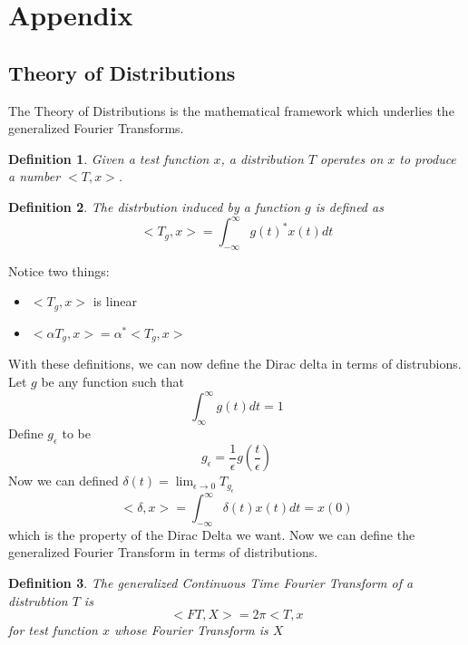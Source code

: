 \documentclass{article}
\newtheorem{definition}{Definition}
\begin{document}
\section{Appendix}
\subsection{Theory of Distributions}
The Theory of Distributions is the mathematical framework which underlies the generalized Fourier Transforms.
\begin{definition}
    Given a test function $x$, a distribution $T$ operates on $x$ to produce a number $<T,x>$.
\end{definition}
\begin{definition}
    The distrbution induced by a function $g$ is defined as
    $$<T_g, x> = \int_{-\infty}^{\infty}{g(t)^*x(t)dt}$$
\end{definition}
Notice two things:
\begin{itemize}
    \item $<T_g, x>$ is linear
    \item $<\alpha T_g, x> = \alpha^*<T_g, x>$
\end{itemize}
With these definitions, we can now define the Dirac delta in terms of distrubions.
Let $g$ be any function such that
$$\int_{\infty}^{\infty}{g(t)dt} = 1$$
Define $g_\epsilon$ to be
$$g_\epsilon = \frac{1}{\epsilon}g(\frac{t}{\epsilon})$$
Now we can defined $\delta(t) = \lim_{\epsilon \rightarrow 0}{T_{g_\epsilon}}$
$$<\delta, x> = \int_{-\infty}^{\infty}{\delta(t)x(t)dt} = x(0)$$ 
which is the property of the Dirac Delta we want. Now we can define the generalized Fourier Transform
in terms of distributions.
\begin{definition}
    The generalized Continuous Time Fourier Transform of a distrubtion $T$ is
    $$<FT, X> = 2\pi<T, x$$
    for test function $x$ whose Fourier Transform is $X$
\end{definition}
\end{document}
